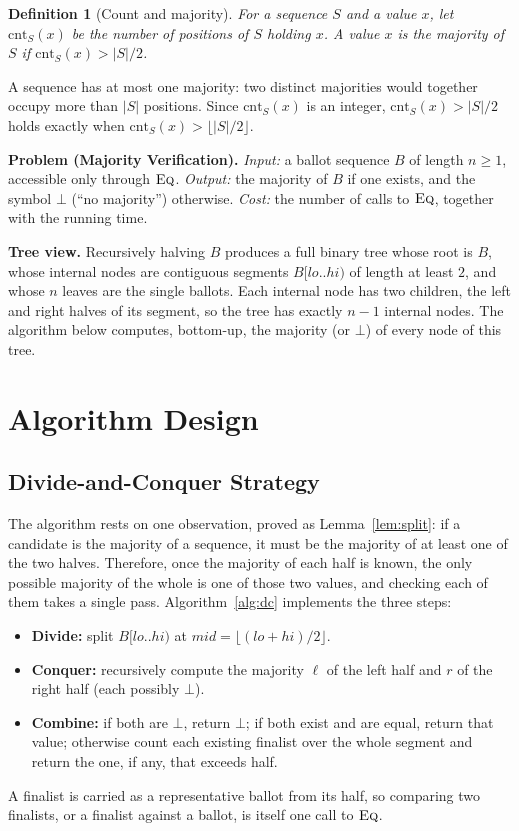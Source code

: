 \documentclass[conference]{IEEEtran}
\newtheorem{definition}{Definition}
\newcommand{\Eq}{\textsc{Eq}}
\newcommand{\cnt}{\mathrm{cnt}}
\begin{document}
\begin{definition}[Count and majority]
For a sequence $S$ and a value $x$, let $\cnt_S(x)$ be the number of positions
of $S$ holding $x$. A value $x$ is the \emph{majority} of $S$ if
$\cnt_S(x) > |S|/2$.
\end{definition}

A sequence has at most one majority: two distinct majorities would together
occupy more than $|S|$ positions. Since $\cnt_S(x)$ is an integer,
$\cnt_S(x) > |S|/2$ holds exactly when $\cnt_S(x) > \lfloor |S|/2 \rfloor$.

\medskip
\noindent\textbf{Problem (Majority Verification).}
\emph{Input:} a ballot sequence $B$ of length $n \ge 1$, accessible only
through $\Eq$.
\emph{Output:} the majority of $B$ if one exists, and the symbol $\bot$
(``no majority'') otherwise.
\emph{Cost:} the number of calls to $\Eq$, together with the running time.

\medskip
\noindent\textbf{Tree view.} Recursively halving $B$ produces a full binary
tree whose root is $B$, whose internal nodes are contiguous segments
$B[lo..hi)$ of length at least $2$, and whose $n$ leaves are the single
ballots. Each internal node has two children, the left and right halves of its
segment, so the tree has exactly $n - 1$ internal nodes. The algorithm below
computes, bottom-up, the majority (or $\bot$) of every node of this tree.

\section{Algorithm Design}\label{sec:algorithm}

\subsection{Divide-and-Conquer Strategy}

The algorithm rests on one observation, proved as Lemma~\ref{lem:split}: if a
candidate is the majority of a sequence, it must be the majority of at least
one of the two halves. Therefore, once the majority of each half is known,
the only possible majority of the whole is one of those two values, and
checking each of them takes a single pass. Algorithm~\ref{alg:dc} implements
the three steps:
\begin{itemize}
  \item \textbf{Divide:} split $B[lo..hi)$ at $mid = \lfloor (lo+hi)/2 \rfloor$.
  \item \textbf{Conquer:} recursively compute the majority $\ell$ of the left
        half and $r$ of the right half (each possibly $\bot$).
  \item \textbf{Combine:} if both are $\bot$, return $\bot$; if both exist and
        are equal, return that value; otherwise count each existing finalist
        over the whole segment and return the one, if any, that exceeds half.
\end{itemize}
A finalist is carried as a representative ballot from its half, so comparing
two finalists, or a finalist against a ballot, is itself one call to $\Eq$.
\end{document}
